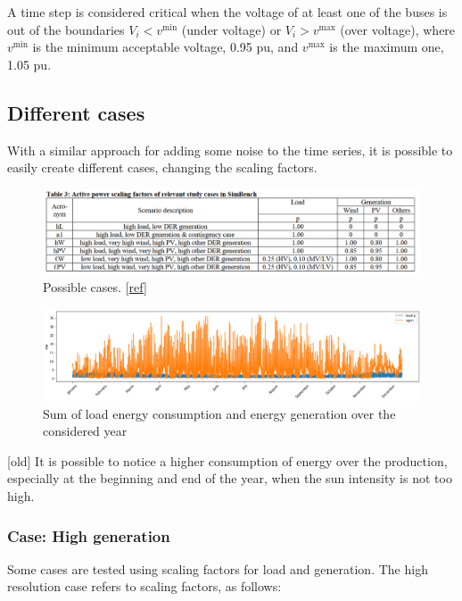 A time step is considered critical when the voltage of at least one of the buses is out of the boundaries $V_i < v^{\text{min}}$ (under voltage) or $V_i > v^{\text{max}}$ (over voltage), where $v^{\text{min}}$ is the minimum acceptable voltage, 0.95 \gls{pu}, and $v^{\text{max}}$ is the maximum one, 1.05 \gls{pu}.

\subsection{Different cases}
With a similar approach for adding some noise to the time series, it is possible to easily create different cases, changing the scaling factors.

\begin{figure}[H]
\centering
    \includegraphics[width=.9\linewidth]{images/MVOberr/Cases.PNG}
\caption{Possible cases. [\href{https://www.cired-repository.org/bitstream/handle/20.500.12455/526/CIRED \%202019 \%20- \%20139.pdf?sequence=1&isAllowed=y}{ref}] }
\label{fig:gym_anm_net}
\end{figure} 



\begin{figure}[h]
\centering
    \includegraphics[width=.9\linewidth]{images/MVOberr/Load&Gens.png}
\caption{Sum of load energy consumption and energy generation over the considered year}
\label{fig:gym_anm_net}
\end{figure}

[old] It is possible to notice a higher consumption of energy over the production, especially at the beginning and end of the year, when the sun intensity is not too high. \\

\subsubsection{Case: High generation}
Some cases are tested using scaling factors for load and generation. The high resolution case refers to scaling factors, as follows:
\begin{algorithm}[h]
    
\end{algorithm}

